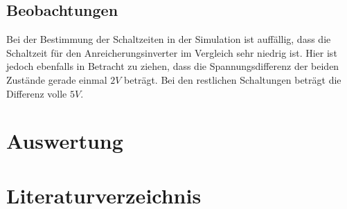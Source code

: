 \documentclass[11pt, a4paper]{article}
\begin{document}
\subsection*{Beobachtungen}
Bei der Bestimmung der Schaltzeiten in der Simulation ist auffällig, dass die Schaltzeit für den Anreicherungsinverter im Vergleich sehr niedrig ist. Hier ist jedoch ebenfalls in Betracht zu ziehen, dass die Spannungsdifferenz der beiden Zustände gerade einmal $2 V$ beträgt. Bei den restlichen Schaltungen beträgt die Differenz volle $5V$.
\section*{Auswertung}
\section*{Literaturverzeichnis}
\end{document}
